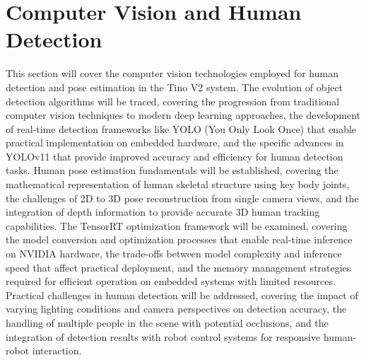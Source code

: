 \section{Computer Vision and Human Detection}
This section will cover the computer vision technologies employed for human detection and pose estimation in the Tino V2 system. The evolution of object detection algorithms will be traced, covering the progression from traditional computer vision techniques to modern deep learning approaches, the development of real-time detection frameworks like YOLO (You Only Look Once) that enable practical implementation on embedded hardware, and the specific advances in YOLOv11 that provide improved accuracy and efficiency for human detection tasks. Human pose estimation fundamentals will be established, covering the mathematical representation of human skeletal structure using key body joints, the challenges of 2D to 3D pose reconstruction from single camera views, and the integration of depth information to provide accurate 3D human tracking capabilities. The TensorRT optimization framework will be examined, covering the model conversion and optimization processes that enable real-time inference on NVIDIA hardware, the trade-offs between model complexity and inference speed that affect practical deployment, and the memory management strategies required for efficient operation on embedded systems with limited resources. Practical challenges in human detection will be addressed, covering the impact of varying lighting conditions and camera perspectives on detection accuracy, the handling of multiple people in the scene with potential occlusions, and the integration of detection results with robot control systems for responsive human-robot interaction.

